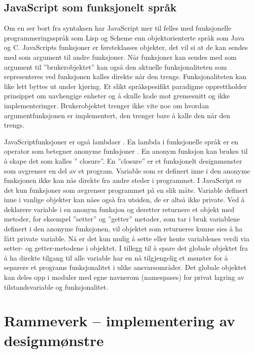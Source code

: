 \documentclass[norsk]{article}
\begin{document}
\subsection{JavaScript som funksjonelt språk}
Om en ser bort fra syntaksen har JavaScript mer til felles med funksjonelle programmeringsspråk som Lisp og Scheme \parencite{crockfordMisunderstood} enn objektorienterte språk som Java og C. JavaScripts funksjoner er førsteklasses objekter, det vil si at de kan sendes med som argument til andre funksjoner. Når funksjoner kan sendes med som argument til ”brukerobjektet” kan også den aktuelle funksjonaliteten som representeres ved funksjonen kalles direkte når den trengs. Funksjonaliteten kan like lett byttes ut under kjøring. Et slikt språkspesifikt paradigme opprettholder prinsippet om uavhengige enheter og å skulle kode mot grensesnitt og ikke implementeringer. Brukerobjektet trenger ikke vite noe om hvordan argumentfunksjonen er implementert, den trenger bare å kalle den når den trengs. 

JavaScriptfunksjoner er også lambdaer \parencite{crockfordLittle}. En lambda i funksjonelle språk er en operator som betegner anonyme funksjoner \parencite{wikiLamb}. En anonym funksjon kan brukes til å skape det som kalles ” closure”. En ”closure” er et funksjonelt designmønster som avgrenser en del av et program.  Variable som er definert inne i den anonyme funksjonen ikke kan nås direkte fra andre steder i programmet. I JavaScript er det kun funksjoner som avgrenser programmet på en slik måte. Variable definert inne i vanlige objekter kan nåes også fra utsiden, de er altså ikke private. Ved å deklarere variable i en anonym funksjon og deretter returnere et objekt med metoder, for eksempel ”setter” og ”getter” metoder, som tar i bruk variablene definert i den anonyme funksjonen, vil objektet som returneres kunne sies å ha fått private variable. Nå er det kun mulig å sette eller hente variablenes verdi via setter- og getter-metodene i objektet. I tillegg til å spare det globale objektet fra å ha direkte tilgang til alle variable har en nå tilgjengelig et mønster for å separere et programs funksjonalitet i ulike ansvarsområder. Det globale objektet kan deles opp i moduler med egne navnerom (namespases) for privat lagring av tilstandsvariable og funksjonalitet. 
\section{Rammeverk – implementering av designmønstre}
\end{document}
